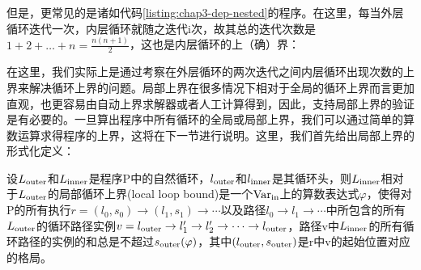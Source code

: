 
但是，更常见的是诸如代码\ref{listing:chap3-dep-nested}的程序。在这里，每当外层循环迭代一次，内层循环就随之迭代i次，故其总的迭代次数是$1
+ 2 + \ldots + n = \frac{n (n +
1)}{2}$，这也是内层循环的上（确）界：


在这里，我们实际上是通过考察在外层循环的两次迭代之间内层循环出现次数的上界来解决循环上界的问题。局部上界在很多情况下相对于全局的循环上界而言更加直观，也更容易由自动上界求解器或者人工计算得到，因此，支持局部上界的验证是有必要的。一旦算出程序中所有循环的全局或局部上界，我们可以通过简单的算数运算求得程序的上界，这将在下一节进行说明。这里，我们首先给出局部上界的形式化定义：

\begin{definition}
  设$L_{\operatorname{outer}}$和$L_{\operatorname{inner}}$是程序P中的自然循环，$l_{\operatorname{outer}}$和$l_{\operatorname{inner}}$是其循环头，则$L_{\operatorname{inner}}$相对于$L_{\operatorname{outer}}$的局部循环上界(local
  loop
  bound)是一个$\operatorname{Var}_{\operatorname{in}}$上的算数表达式$\varphi$，使得对P的所有执行$r
  = (l_0, s_0) \rightarrow (l_1, s_1) \rightarrow \cdots$以及路径$l_0
  \rightarrow l_1 \rightarrow
  \cdots$中所包含的所有$L_{\operatorname{outer}}$的循环路径实例$v =
  l_{\operatorname{outer}} \rightarrow l_1' \rightarrow l_2' \rightarrow \cdots
  \rightarrow
  l_{\operatorname{outer}}$，路径v中$L_{\operatorname{inner}}$的所有循环路径的实例的和总是不超过$s_{\operatorname{outer}}
  (\varphi)$，其中$(l_{\operatorname{outer}},
  s_{\operatorname{outer}})$是r中v的起始位置对应的格局。
\end{definition}

